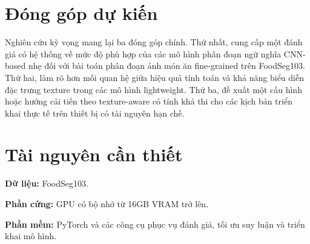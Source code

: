 






\section*{Đóng góp dự kiến}

Nghiên cứu kỳ vọng mang lại ba đóng góp chính. Thứ nhất, cung cấp một đánh giá có hệ thống về mức độ phù hợp của các mô hình phân đoạn ngữ nghĩa CNN-based nhẹ đối với bài toán phân đoạn ảnh món ăn fine-grained trên FoodSeg103. Thứ hai, làm rõ hơn mối quan hệ giữa hiệu quả tính toán và khả năng biểu diễn đặc trưng texture trong các mô hình lightweight. Thứ ba, đề xuất một cấu hình hoặc hướng cải tiến theo texture-aware có tính khả thi cho các kịch bản triển khai thực tế trên thiết bị có tài nguyên hạn chế.

\section*{Tài nguyên cần thiết}
\textbf{Dữ liệu:} FoodSeg103.  

\textbf{Phần cứng:} GPU có bộ nhớ từ 16GB VRAM trở lên.  

\textbf{Phần mềm:} PyTorch và các công cụ phục vụ đánh giá, tối ưu suy luận và triển khai mô hình.